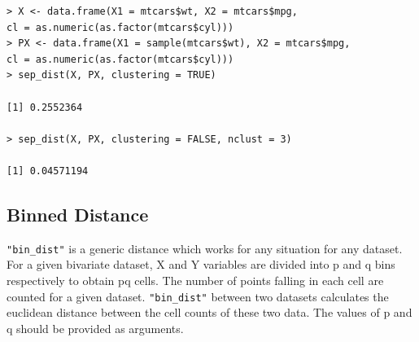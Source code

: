 \documentclass[article]{jss}
\begin{document}
%

\begin{verbatim}
> X <- data.frame(X1 = mtcars$wt, X2 = mtcars$mpg, 
cl = as.numeric(as.factor(mtcars$cyl)))
> PX <- data.frame(X1 = sample(mtcars$wt), X2 = mtcars$mpg, 
cl = as.numeric(as.factor(mtcars$cyl)))
> sep_dist(X, PX, clustering = TRUE)

[1] 0.2552364

> sep_dist(X, PX, clustering = FALSE, nclust = 3)

[1] 0.04571194
\end{verbatim}

\subsection{Binned Distance}\label{binned-distance}

\texttt{"bin\_dist"} is a generic distance which works for any situation
for any dataset. For a given bivariate dataset, X and Y variables are
divided into p and q bins respectively to obtain pq cells. The number of
points falling in each cell are counted for a given dataset.
\texttt{"bin\_dist"} between two datasets calculates the euclidean
distance between the cell counts of these two data. The values of p and
q should be provided as arguments.

%
\end{document}
